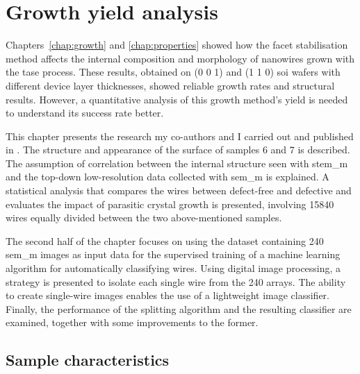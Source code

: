 \chapter{Growth yield analysis}
\label{chap:yield_analysis}

Chapters~\ref{chap:growth} and \ref{chap:properties} showed how the  facet stabilisation method affects the internal composition and morphology of nanowires grown with the \acf{tase} process. These results, obtained on \hkl(0 0 1) and \hkl(1 1 0) \acf{soi} wafers with different device layer thicknesses, showed reliable growth rates and structural results. However, a quantitative analysis of this growth method's yield is needed to understand its success rate better. 

This chapter presents the research my co-authors and I carried out and published in \cite{Brugnolotto2023_2, Brugnolotto2024}. The structure and appearance of the surface of samples 6 and 7 is described. The assumption of correlation between the internal structure seen with \acf{stem_m} and the top-down low-resolution data collected with \acf{sem_m} is explained. A statistical analysis that compares the wires between defect-free and defective and evaluates the impact of parasitic crystal growth is presented, involving \num{15840} wires equally divided between the two above-mentioned samples. 

The second half of the chapter focuses on using the dataset containing \num{240} \acs{sem_m} images as input data for the supervised training of a machine learning algorithm for automatically classifying wires. Using digital image processing, a strategy is presented to isolate each single wire from the \num{240} arrays. The ability to create single-wire images enables the use of a lightweight image classifier. Finally, the performance of the splitting algorithm and the resulting classifier are examined, together with some improvements to the former.

\section{Sample characteristics}


